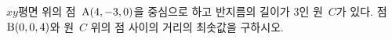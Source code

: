 $xy$평면 위의 점~$\mathrm{A}(4{,}\mkern3mu\mathopen{}-3{,}\mkern3mu\mathopen{}0)$을 중심으로 하고 반지름의 길이가 $3$인 원~$C$가 있다. 점~$\mathrm{B}(0{,}\mkern3mu\mathopen{}0{,}\mkern3mu\mathopen{}4)$와 원~$C$ 위의 점 사이의 거리의 최솟값을 구하시오.
